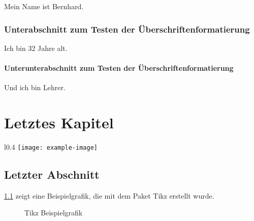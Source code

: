 Mein Name ist Bernhard.

\subsection{Unterabschnitt zum Testen der Überschriftenformatierung}\label{subsec:formattest}

Ich bin 32 Jahre alt.

\subsubsection{Unterunterabschnitt zum Testen der Überschriftenformatierung}\label{subsubsec:formattest}

Und ich bin Lehrer.

\clearpage

\chapter{Letztes Kapitel}\label{chap:last}

\lipsum[6]

\begin{wrapfigure}{l}{0.4\textwidth}
    \centering
    \texttt{[image: example-image]}
    \captionsetup{width=0.9\linewidth}
    \caption[Beispielabbildung mit Text umrandet]{Beispielabbildung mit Text umrandet (eigene Abbildung)}
    \label{fig:textwrappedaroundexampleimage}
\end{wrapfigure}

\lipsum[7-9]

\clearpage

\section{Letzter Abschnitt}\label{sec:last}

\cref{fig:tikzexamplegraphics} zeigt eine Beispielgrafik, die mit dem Paket \glqq Tikz\grqq{} erstellt wurde.

\begin{figure}[!ht]
    \centering
    \caption{Tikz Beispielgrafik}
    \label{fig:tikzexamplegraphics}
\end{figure}

